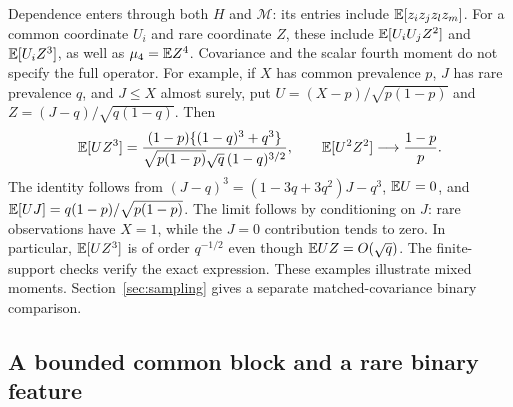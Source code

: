 Dependence enters through both $H$ and $\mathcal M$: its entries include
$\mathbb{E}[z_i z_j z_l z_m]$. For a common coordinate $U_i$ and rare coordinate $Z$,
these include $\mathbb{E}[U_iU_jZ^2]$ and $\mathbb{E}[U_iZ^3]$, as well as $\mu_4 = \mathbb{E} Z^4$.
Covariance and the scalar fourth moment do not specify the full operator. For
example, if $X$ has common prevalence $p$, $J$ has rare prevalence $q$, and
$J \le X$ almost surely, put $U = (X - p)/\sqrt{p(1 - p)}$ and
$Z = (J - q)/\sqrt{q(1 - q)}$. Then
\begin{equation}
 \label{eq:nested-mixed-fourth}
 \mathbb{E}[UZ^3] = \frac{(1 - p)\{(1 - q)^3 + q^3\}}
 {\sqrt{p(1 - p)}\sqrt q\,(1 - q)^{3/2}},\qquad \mathbb{E}[U^2Z^2]
          \longrightarrow \frac{1 - p}{p}.
\end{equation}
The identity follows from $(J - q)^3 = (1 - 3q + 3q^2)J - q^3$, $\mathbb{E} U = 0$, and
$\mathbb{E}[UJ] = q(1 - p)/\sqrt{p(1 - p)}$. The limit follows by conditioning on $J$:
rare observations have $X = 1$, while the $J = 0$ contribution tends to zero. In
particular, $\mathbb{E}[UZ^3]$ is of order $q^{-1/2}$ even though $\mathbb{E} UZ = O(\sqrt q)$.
The finite-support checks verify the exact expression. These examples illustrate
mixed moments. Section~\ref{sec:sampling} gives a separate matched-covariance
binary comparison.

\subsection{A bounded common block and a rare binary feature}

